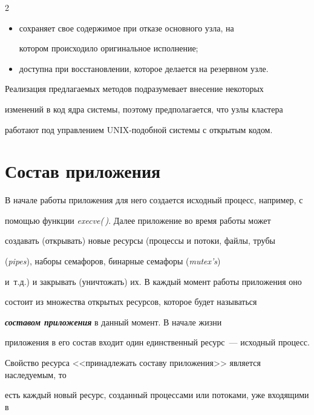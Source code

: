 \begin{multicols}{2}
\begin{itemize}
\item сохраняет свое содержимое при отказе основного узла, на

котором происходило оригинальное исполнение; %

\item доступна при восстановлении, которое делается на резервном узле.

\end{itemize}




Реализация предлагаемых методов подразумевает внесение некоторых

изменений в код ядра сис\-те\-мы, поэтому предполагается, что узлы кластера

работают под управлением UNIX-подобной сис\-те\-мы с открытым кодом.



\vspace*{-6pt}

\section{Состав приложения}

\vspace*{-2pt}



В начале работы приложения для него создается исходный процесс, например, с 

по\-мощью функции \emph{execve(\,)}. Далее приложение во время работы может 

создавать (открывать) новые ресурсы (процессы и потоки, файлы, трубы 

(\textit{pipes}), наборы семафоров, бинарные семафоры (\textit{mutex's}) 

и~т.д.) и закрывать (уничтожать) их. В каждый момент работы приложения оно 

состоит из множества открытых ресурсов, которое будет называться 

{\bfseries\textit{составом приложения}} в данный момент. В начале жизни 

приложения в его состав входит один единственный ресурс~--- исходный процесс. 

Свойство ресурса <<принадлежать составу приложения>> является наследуемым, то 

есть каждый новый ресурс, созданный процессами или потоками, уже входящими в 


\end{multicols}
